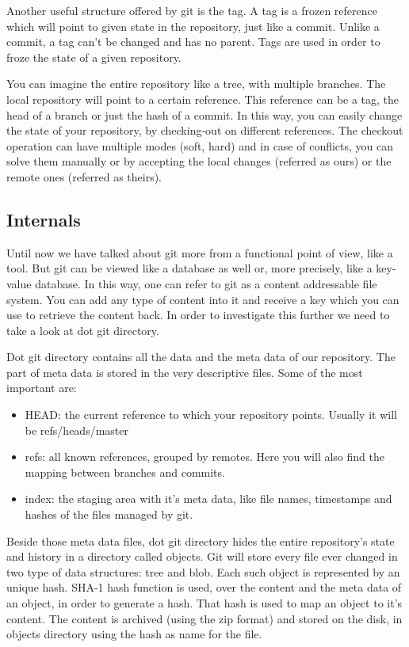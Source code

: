         Another useful structure offered by git is the tag. A tag is a frozen reference which will point to given state in the repository, just like a commit. Unlike a commit, a tag can't be changed and has no parent. Tags are used in order to froze the state of a given repository. 
        
        You can imagine the entire repository like a tree, with multiple branches. The local repository will point to a certain reference. This reference can be a tag, the head of a branch or just the hash of a commit. In this way, you can easily change the state of your repository, by checking-out on different references. The checkout operation can have multiple modes (soft, hard) and in case of conflicts, you can solve them manually or by accepting the local changes (referred as ours) or the remote ones (referred as theirs).
        
    \subsection{Internals}
        Until now we have talked about git more from a functional point of view, like a tool. But git can be viewed like a database as well or, more precisely, like a key-value database. In this way, one can refer to git as a content addressable file system. You can add any type of content into it and receive a key which you can use to retrieve the content back. In order to investigate this further we need to take a look at dot git directory.
        
        Dot git directory contains all the data and the meta data of our repository. The part of meta data is stored in the very descriptive files. Some of the most important are:
        
        \begin{itemize}
            \item HEAD: the current reference to which your repository points. Usually it will be refs/heads/master
            \item refs: all known references, grouped by remotes. Here you will also find the mapping between branches and commits.
            \item index: the staging area with it's meta data, like file names, timestamps and hashes of the files managed by git.
        \end{itemize}
        
        Beside those meta data files, dot git directory hides the entire repository's state and history in a directory called objects. Git will store every file ever changed in two type of data structures: tree and blob. Each such object is represented by an unique hash. SHA-1 hash function is used, over the content and the meta data of an object, in order to generate a hash. That hash is used to map an object to it's content. The content is archived (using the zip format) and stored on the disk, in objects directory using the hash as name for the file.
        
